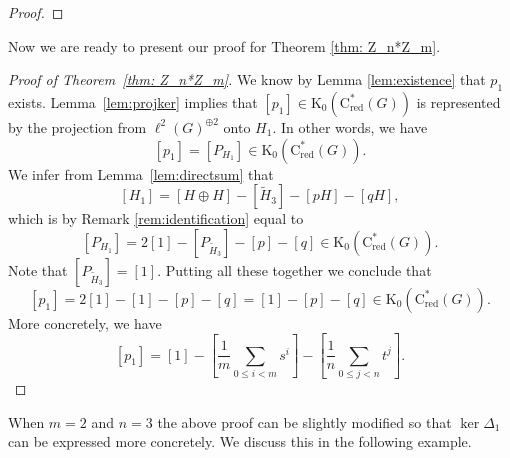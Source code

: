 \documentclass[a4paper,leqno,12pt]{article}
\numberwithin{equation}{section}
\theoremstyle{plain}
\theoremstyle{definition}
\theoremstyle{remark}
\newcommand{\Csr}{\mathrm{C}^*_{\text{red}}}
\begin{document}
\begin{proof}
	\end{proof}
	
	Now we are ready to present our proof for Theorem \ref{thm: Z_n*Z_m}.
	
	\begin{proof}
		[Proof of Theorem~\ref{thm: Z_n*Z_m}]
		 We know by Lemma \ref{lem:existence} that $p_1$ exists. 
		Lemma~\ref{lem:projker} implies that 
		$[p_1]\in \mathrm K_0(\Csr(G))$ is represented by the projection from $\ell^2(G) ^{\oplus 2}$ onto $H_1$. 
		In other words, we have \begin{equation*}
			[p_1]=[P_{H_1}]\in \mathrm K_0(\Csr(G)).
		\end{equation*}		
		 We infer from Lemma~\ref{lem:directsum} that
		\[
			[H_1]=[H\oplus H]-[\tilde H_3]-[pH]-[qH],
		\]
		which is by Remark \ref{rem:identification} equal to 
		\begin{equation*}
			[P_{H_1}]=2[1]-[P_{\tilde H_3}]-[p]-[q]\in \mathrm K_0(\Csr(G)).
		\end{equation*}
		Note that $[P_{\tilde H_3}]=[1]$. 
		Putting all these together we conclude that
		\[
			[p_1]=2[1]-[1]-[p]-[q]=[1]-[p]-[q]
			\in 
			\mathrm K_0(\Csr(G)).
		\]
		More concretely, we have 
		\[
		[p_1] = [1] - \left[\frac{1}{m}
		\sum_{0 \leq i < m}{s^i}\right] - 
		\left[\frac{1}{n}
		\sum_{0 \leq j <n}{t^j}\right].
		\]		
	\end{proof}
	
	
	When $m=2$ and $n=3$ the above proof can be slightly modified so that $\ker\Delta_1$ can be expressed more concretely. We discuss this in the following example.
	
\end{document}
